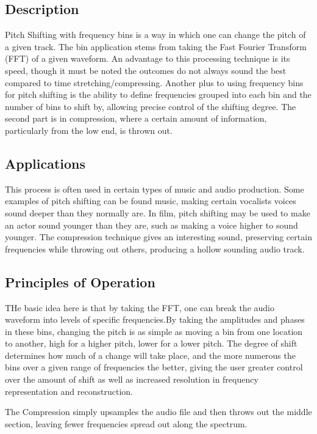 \subsection{Description}
Pitch Shifting with frequency bins is a way in which one can change the pitch of a given track. The bin application stems from taking the Fast Fourier Transform (FFT) of a given waveform. An advantage to this processing technique is its speed, though it must be noted the outcomes do not always sound the best compared to time stretching/compressing. Another plus to using frequency bins for pitch shifting is the ability to define frequencies grouped into each bin and the number of bins to shift by, allowing precise control of the shifting degree. The second part is in compression, where a certain amount of information, particularly from the low end, is thrown out.

\subsection{Applications}
This process is often used in certain types of music and audio production. Some examples of pitch shifting can be found music, making certain vocalists voices sound deeper than they normally are. In film, pitch shifting may be used to make an actor sound younger than they are, such as making a voice higher to sound younger. The compression technique gives an interesting sound, preserving certain frequencies while throwing out others, producing a hollow sounding audio track.

\subsection{Principles of Operation}
THe basic idea here is that by taking the FFT, one can break the audio waveform into levels of specific frequencies.By taking the amplitudes and phases in these bins, changing the pitch is as simple as moving a bin from one location to another, high for a higher pitch, lower for a lower pitch. The degree of shift determines how much of a change will take place, and the more numerous the bins over a given range of frequencies the better, giving the user greater control over the amount of shift as well as increased resolution in frequency representation and reconstruction. 

The Compression simply upsamples the audio file and then throws out the middle section, leaving fewer frequencies spread out along the spectrum. 

